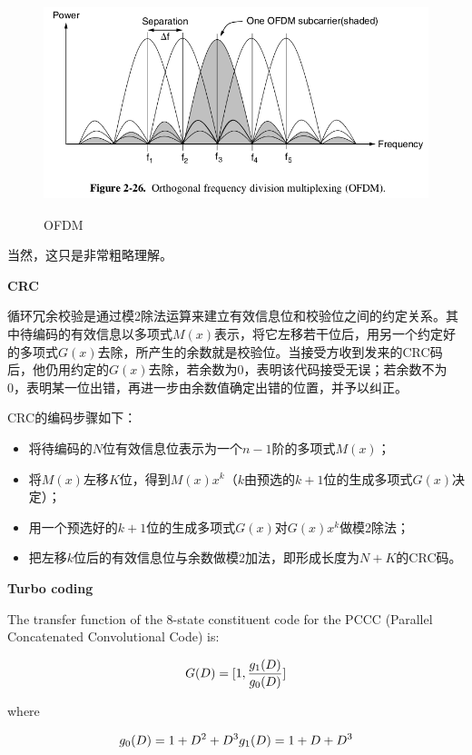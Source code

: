 \documentclass[titlepage]{article}
\numberwithin{figure}{section}
\numberwithin{equation}{section}
\begin{document}
\begin{figure}[htbp]
	\centering
	\includegraphics[height=2.5in]{OFDM}
	\caption{OFDM}
\end{figure}

当然，这只是非常粗略理解。

\textbf{CRC}

循环冗余校验是通过模2除法运算来建立有效信息位和校验位之间的约定关系。其中待编码的有效信息以多项式$M(x)$表示，将它左移若干位后，用另一个约定好的多项式$G(x)$去除，所产生的余数就是校验位。当接受方收到发来的CRC码后，他仍用约定的$G(x)$去除，若余数为0，表明该代码接受无误；若余数不为0，表明某一位出错，再进一步由余数值确定出错的位置，并予以纠正。

CRC的编码步骤如下：

\begin{itemize}
	\item 将待编码的$N$位有效信息位表示为一个$n-1$阶的多项式$M(x)$；
	\item 将$M(x)$左移$K$位，得到$M(x)x^{k}$（$k$由预选的$k+1$位的生成多项式$G(x)$决定）；
	\item 用一个预选好的$k+1$位的生成多项式$G(x)$对$G(x)x^{k}$做模2除法；
	\item 把左移$k$位后的有效信息位与余数做模2加法，即形成长度为$N+K$的CRC码。
\end{itemize}

\textbf{Turbo coding}

The transfer function of the 8-state constituent code for the PCCC (Parallel Concatenated Convolutional Code) is\cite{36series-212}:

\begin{displaymath}
	G(D)=[1,{g_{1}(D) \over g_{0}(D)}]
\end{displaymath}

where

\begin{displaymath}
	g_{0}(D)=1+D^{2}+D^{3} \\
	g_{1}(D)=1+D+D^{3}
\end{displaymath}
\end{document}
